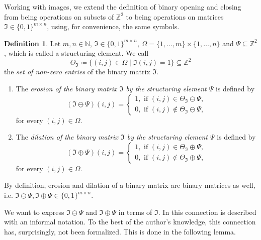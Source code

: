 \documentclass[a4paper,12pt]{article}
\theoremstyle{plain}
\theoremstyle{definition}
\newtheorem{definition}[theorem]{Definition}
\numberwithin{equation}{section}
\begin{document}
Working with images, we extend the definition of binary opening and closing from being operations on subsets of $\mathbb{Z}^2$ to being operations on matrices $\mathfrak{I} \in \{ 0, 1 \}^{m \times n}$, using, for convenience, the same symbols.

\begin{definition}
	Let $m, n \in \mathbb{N}$, $\mathfrak{I} \in \{ 0, 1 \}^{m \times n}$, $\Omega = \{ 1, \dots, m \} \times \{ 1, \dots, n \}$ and $\Psi \subseteq \mathbb{Z}^2$, which is called a structuring element. We call
	\begin{equation*}
		\Theta_\mathfrak{I} \coloneqq \{ (i, j) \in \Omega \mid \mathfrak{I}(i, j) = 1 \} \subseteq \mathbb{Z}^2
	\end{equation*}
	the \emph{set of non-zero entries} of the binary matrix $\mathfrak{I}$.
	\begin{enumerate}
		\item The \emph{erosion of the binary matrix $\mathfrak{I}$ by the structuring element $\Psi$} is defined by
		\begin{equation}
			(\mathfrak{I} \ominus \Psi)(i, j) =
			\begin{cases}
				1, \textrm{ if } (i, j) \in \Theta_\mathfrak{I} \ominus \Psi, \\
				0, \textrm{ if } (i, j) \notin \Theta_\mathfrak{I} \ominus \Psi,
			\end{cases}
		\end{equation}
		for every $(i, j) \in \Omega$.
		\item The \emph{dilation of the binary matrix $\mathfrak{I}$ by the structuring element $\Psi$} is defined by
		\begin{equation}
			(\mathfrak{I} \oplus \Psi)(i, j) =
			\begin{cases}
				1, \textrm{ if } (i, j) \in \Theta_\mathfrak{I} \oplus \Psi, \\
				0, \textrm{ if } (i, j) \notin \Theta_\mathfrak{I} \oplus \Psi,
			\end{cases}
		\end{equation}
		for every $(i, j) \in \Omega$.
	\end{enumerate}
\end{definition}

By definition, erosion and dilation of a binary matrix are binary matrices as well, i.e. $\mathfrak{I} \ominus \Psi, \mathfrak{I} \oplus \Psi \in \{ 0, 1 \}^{m \times n}$.

We want to express $\mathfrak{I} \ominus \Psi$ and $\mathfrak{I} \oplus \Psi$ in terms of $\mathfrak{I}$. In \cite[p.~65-67]{imageprocessing} this connection is described with an informal notation. To the best of the author's knowledge, this connection has, surprisingly, not been formalized. This is done in the following lemma.
\end{document}
